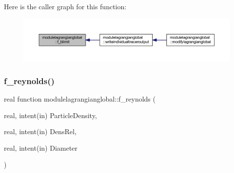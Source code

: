 Here is the caller graph for this function\+:\nopagebreak
\begin{figure}[H]
\begin{center}
\leavevmode
\includegraphics[width=350pt]{namespacemodulelagrangianglobal_ae741ac31795a4ede3b77f20ffacd71c0_icgraph}
\end{center}
\end{figure}
\mbox{\label{namespacemodulelagrangianglobal_abb6d8c7acaf1915a70609c5d8763d229}} 
\subsubsection{\texorpdfstring{f\+\_\+reynolds()}{f\_reynolds()}}
{\footnotesize\ttfamily real function modulelagrangianglobal\+::f\+\_\+reynolds (\begin{DoxyParamCaption}\item[{real, intent(in)}]{Particle\+Density,  }\item[{real, intent(in)}]{Dens\+Rel,  }\item[{real, intent(in)}]{Diameter }\end{DoxyParamCaption})\hspace{0.3cm}{\ttfamily [private]}}

